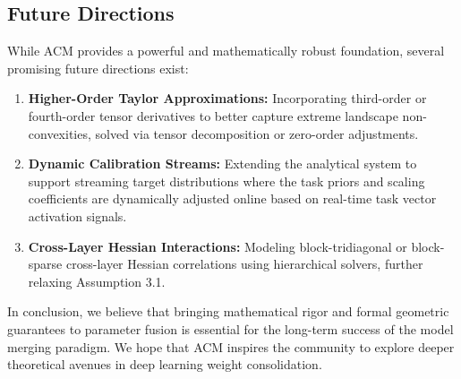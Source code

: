 \subsection{Future Directions}
While ACM provides a powerful and mathematically robust foundation, several promising future directions exist:
\begin{enumerate}
    \item \textbf{Higher-Order Taylor Approximations:} Incorporating third-order or fourth-order tensor derivatives to better capture extreme landscape non-convexities, solved via tensor decomposition or zero-order adjustments.
    \item \textbf{Dynamic Calibration Streams:} Extending the analytical system to support streaming target distributions where the task priors and scaling coefficients are dynamically adjusted online based on real-time task vector activation signals.
    \item \textbf{Cross-Layer Hessian Interactions:} Modeling block-tridiagonal or block-sparse cross-layer Hessian correlations using hierarchical solvers, further relaxing Assumption 3.1.
\end{enumerate}
In conclusion, we believe that bringing mathematical rigor and formal geometric guarantees to parameter fusion is essential for the long-term success of the model merging paradigm. We hope that ACM inspires the community to explore deeper theoretical avenues in deep learning weight consolidation.
